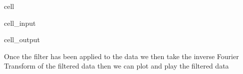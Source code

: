 \documentclass[letterpaper,10pt,english]{jupyterBook}
\begin{document}
\begin{sphinxuseclass}{cell}
\begin{sphinxVerbatimInput}
\begin{sphinxuseclass}{cell_input}
\end{sphinxuseclass}\end{sphinxVerbatimInput}
\begin{sphinxVerbatimOutput}

\begin{sphinxuseclass}{cell_output}
\noindent{}

\end{sphinxuseclass}\end{sphinxVerbatimOutput}

\end{sphinxuseclass}
\sphinxAtStartPar
Once the filter has been applied to the data we then take the inverse Fourier Transform of the filtered data then we can plot and play the filtered data
\end{document}
